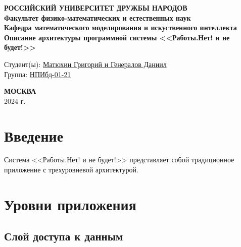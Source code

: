 \documentclass[a4page]{article}
\begin{document}

\begin{titlepage}

\begin{center}
\hfill \break
\textbf{
\large{РОССИЙСКИЙ УНИВЕРСИТЕТ ДРУЖБЫ НАРОДОВ}\\
\normalsize{Факультет физико-математических и естественных наук}\\ 
\normalsize{Кафедра математического моделирования и искуственного интеллекта}\\
}
\vspace*{\fill}
\Large{\textbf{Описание архитектуры программной системы <<Работы.Нет! и не будет!>>}}
\vspace*{\fill}

\end{center}
 
 \begin{flushright}
 Студент(ы): \underline{Матюхин Григорий и Генералов Даниил}\\ \vspace{0.5cm}
 Группа: \underline{НПИбд-01-21}
 \end{flushright}
 
 
\begin{center} \textbf{МОСКВА} \\ 2024 г. \end{center}
\thispagestyle{empty} %

\end{titlepage}

\newpage

\tableofcontents

\newpage

\section{Введение}

Система <<Работы.Нет! и не будет!>> представляет собой
традиционное приложение с трехуровневой архитектурой.

\newpage
\section{Уровни приложения}

\subsection{Слой доступа к данным}
\end{document}
